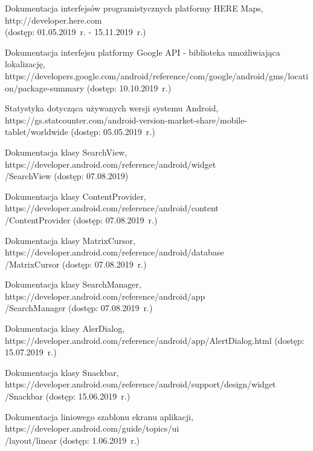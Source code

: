 \begin{thebibliography}{3}                      %
\small
{} Dokumentacja interfejsów programistycznych platformy HERE Maps, http://developer.here.com \\(dostęp: 01.05.2019~r. - 15.11.2019~r.)

   Dokumentacja interfejsu platformy Google API - biblioteka umożliwiająca lokalizację, https://developers.google.com/android/reference/com/google/android/gms/location/package-summary (dostęp: 10.10.2019~r.)

   Statystyka dotycząca używanych wersji systemu Android, https://gs.statcounter.com/android-version-market-share/mobile-tablet/worldwide (dostęp: 05.05.2019~r.)

   Dokumentacja klasy SearchView, https://developer.android.com/reference/android/widget\\/SearchView (dostęp: 07.08.2019)

   Dokumentacja klasy ContentProvider, https://developer.android.com/reference/android/content\\/ContentProvider (dostęp: 07.08.2019~r.)

   Dokumentacja klasy MatrixCursor, https://developer.android.com/reference/android/database\\/MatrixCursor (dostęp: 07.08.2019~r.)

   Dokumentacja klasy SearchManager, https://developer.android.com/reference/android/app\\/SearchManager (dostęp: 07.08.2019~r.)

   Dokumentacja klasy AlerDialog, https://developer.android.com/reference/android/app/AlertDialog.html (dostęp: 15.07.2019~r.)
  
   Dokumentacja klasy Snackbar, https://developer.android.com/reference/android/support/design/widget\\/Snackbar (dostęp: 15.06.2019~r.)
  
   Dokumentacja liniowego szablonu ekranu aplikacji, https://developer.android.com/guide/topics/ui\\/layout/linear (dostęp: 1.06.2019~r.)
  

\end{thebibliography}
